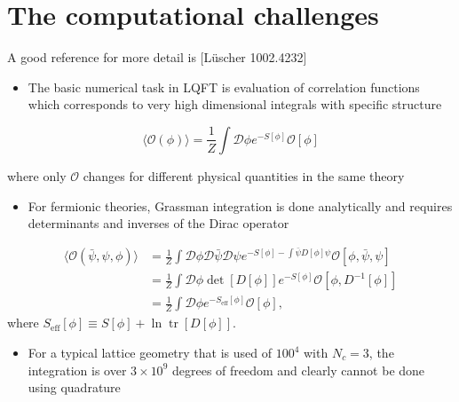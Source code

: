 

\section{The computational challenges}

A good reference for more detail is [L\"uscher 1002.4232]
\begin{itemize}
  \item The basic numerical task in LQFT is evaluation of correlation functions which corresponds to very high dimensional integrals with specific structure
\end{itemize}

\begin{equation}
\langle\mathcal{O}(\phi)\rangle=\frac{1}{Z} \int \mathcal{D} \phi e^{-S[\phi]} \mathcal{O}[\phi]
\end{equation}

where only $\mathcal{O}$ changes for different physical quantities in the same theory

\begin{itemize}
  \item For fermionic theories, Grassman integration is done analytically and requires determinants and inverses of the Dirac operator
\end{itemize}

\begin{align}
    \langle \mathcal{O}(\bar{\psi}, \psi, \phi) \rangle &= \frac{1}{Z} \int \mathcal{D}\phi \mathcal{D}\bar{\psi} \mathcal{D}\psi e^{-S[\phi]-\int \bar{\psi}D[\phi] \psi} \mathcal{O}[\phi, \bar{\psi}, \psi] \nonumber \\
    &= \frac{1}{Z}\int \mathcal{D}\phi  \operatorname{det}[D[\phi]]e^{-S[\phi]}\mathcal{O}[\phi, D^{-1}[\phi]] \nonumber \\
    &= \frac{1}{Z}\int \mathcal{D}\phi  e^{-S_\text{eff}[\phi]}\mathcal{O}[\phi],
\end{align}
where $S_\text{eff}[\phi] \equiv S[\phi] + \ln \operatorname{tr}[D[\phi]]$.

\begin{itemize}
    \item For a typical lattice geometry that is used of $100^4$ with $N_c = 3$, the integration is over $3 \times 10^9$ degrees of freedom and clearly cannot be done using quadrature
\end{itemize}

